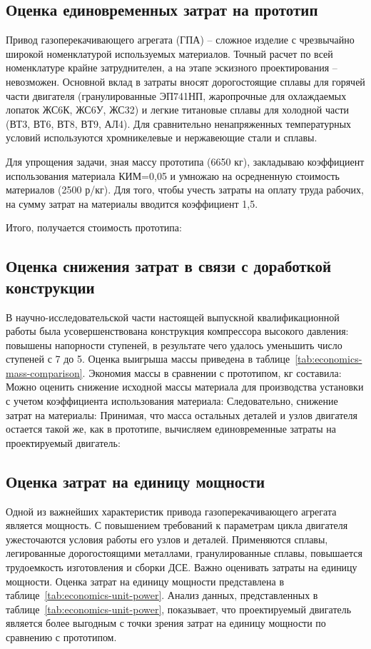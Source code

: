 \subsection{Оценка единовременных затрат на прототип}
Привод газоперекачивающего агрегата (ГПА) – сложное изделие с чрезвычайно широкой номенклатурой используемых материалов.
Точный расчет по всей номенклатуре крайне затруднителен, а на этапе эскизного проектирования – невозможен. Основной
вклад в затраты вносят дорогостоящие сплавы для горячей части двигателя (гранулированные ЭП741НП, жаропрочные для
охлаждаемых лопаток ЖС6К, ЖС6У, ЖС32) и легкие титановые сплавы для холодной части (ВТ3, ВТ6, ВТ8, ВТ9, АЛ4). Для
сравнительно ненапряженных температурных условий используются хромникелевые и нержавеющие стали и сплавы.

Для упрощения задачи, зная массу прототипа (6650 кг), закладываю коэффициент использования материала КИМ=0,05 и умножаю
на осредненную стоимость материалов (2500 р/кг). Для того, чтобы учесть затраты на оплату труда рабочих, на сумму затрат
на материалы вводится коэффициент 1,5.

Итого, получается стоимость прототипа:
\subsection{Оценка снижения затрат в связи с доработкой конструкции}
В научно-исследовательской части настоящей выпускной квалификационной работы была усовершенствована конструкция
компрессора высокого давления: повышены напорности ступеней, в результате чего удалось уменьшить число ступеней с 7 до 5.
Оценка выигрыша массы приведена в таблице~\ref{tab:economics-mass-comparison}.
Экономия массы в сравнении с прототипом, кг составила:
Можно оценить снижение исходной массы материала для производства установки с учетом коэффициента использования материала:
Следовательно, снижение затрат на материалы:
Принимая, что масса остальных деталей и узлов двигателя остается такой же, как в прототипе, вычисляем единовременные
затраты на проектируемый двигатель:
\subsection{Оценка затрат на единицу мощности}
Одной из важнейших характеристик привода газоперекачивающего агрегата является мощность. С повышением требований к
параметрам цикла двигателя ужесточаются условия работы его узлов и деталей. Применяются сплавы, легированные
дорогостоящими металлами, гранулированные сплавы, повышается трудоемкость изготовления и сборки ДСЕ. Важно оценивать
затраты на единицу мощности. Оценка затрат на единицу мощности представлена в таблице~\ref{tab:economics-unit-power}.
Анализ данных, представленных в таблице~\ref{tab:economics-unit-power}, показывает, что проектируемый двигатель является более выгодным с точки зрения
затрат на единицу мощности по сравнению с прототипом.

